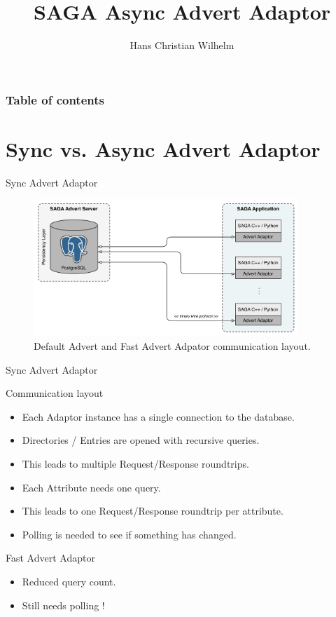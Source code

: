 \documentclass{beamer}
\title{SAGA Async Advert Adaptor}
\author[H.C. Wilhelm]{Hans Christian Wilhelm}
\institute[hcwilhelm@mac.com]{}
\begin{document}
  
  \begin{frame}
    \titlepage
  \end{frame}
  
  \begin{frame}
    \frametitle{Table of contents}
  	\tableofcontents
  \end{frame}
  
  \section{Sync vs. Async Advert Adaptor}
    \begin{frame}{Sync Advert Adaptor}
      \begin{figure}
        \includegraphics[width=10cm]{old_technology_overview}
        \caption{Default Advert and Fast Advert Adpator communication layout.}  
      \end{figure}
    \end{frame}
    
    \begin{frame}{Sync Advert Adaptor}
      \begin{block}{Communication layout}
        \begin{itemize}
          \item Each Adaptor instance has a single connection to the database.
          \item Directories / Entries are opened with recursive queries.
          \item This leads to multiple Request/Response roundtrips.
          \item Each Attribute needs one query.
          \item This leads to one Request/Response roundtrip per attribute.
          \item Polling is needed to see if something has changed.
        \end{itemize}
      \end{block}
      
      \begin{alertblock}{Fast Advert Adaptor}
             \begin{itemize}
               \item Reduced query count.
               \item Still needs polling !
             \end{itemize} 
      \end{alertblock}
    \end{frame}
    
\end{document}
